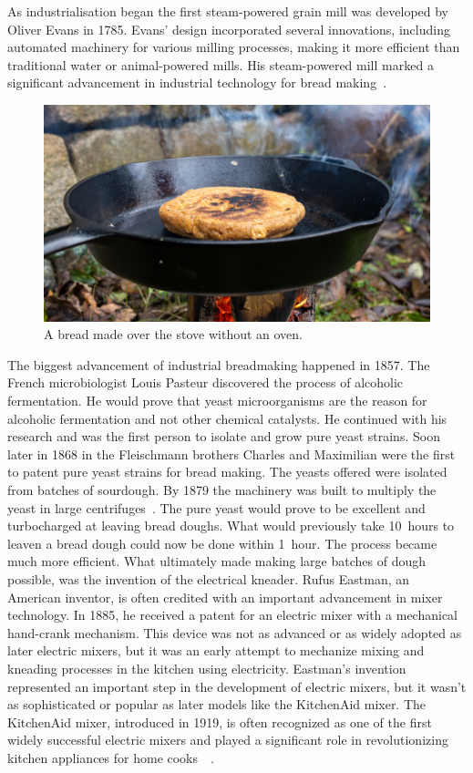 As industrialisation began the first steam-powered grain mill
was developed by Oliver Evans in \num{1785}. Evans' design incorporated
several innovations, including automated machinery for various
milling processes, making it more efficient than traditional water
or animal-powered mills. His steam-powered mill marked a significant advancement
in industrial technology for bread making~\cite{evans+mill}.

\begin{figure}[ht]
  \includegraphics[width=\textwidth]{sourdough-stove}
  \caption{A bread made over the stove without an oven.}%
  \label{sourdough-stove}
\end{figure}

The biggest advancement of industrial breadmaking happened in \num{1857}.
The French microbiologist Louis Pasteur discovered
the process of alcoholic fermentation. He would prove that
yeast microorganisms are the reason for alcoholic fermentation
and not other chemical catalysts. He continued with his research and
was the first person to isolate and grow pure yeast strains.
Soon later in \num{1868} in the Fleischmann brothers Charles
and Maximilian were the first to patent pure yeast strains
for bread making. The yeasts offered
were isolated from batches of sourdough. By \num{1879} the machinery was built
to multiply the yeast in large centrifuges~\cite{fleischmann+history}.
The pure yeast would prove to be excellent and turbocharged
at leaving bread doughs. What would previously take 10~hours
to leaven a bread dough could now be done within 1~hour.
The process became much more efficient. What ultimately made making large
batches of dough possible, was the invention of the electrical kneader.
Rufus Eastman, an American inventor, is often credited with an
important advancement in mixer technology. In \num{1885}, he received a patent
for an electric mixer with a mechanical hand-crank mechanism.
This device was not as advanced or as widely adopted as later
electric mixers, but it was an early attempt to mechanize mixing
and kneading processes in the kitchen using electricity.
Eastman's invention represented an important step in the development
of electric mixers, but it wasn't as sophisticated or popular as
later models like the KitchenAid mixer. The KitchenAid mixer,
introduced in \num{1919}, is often recognized as one of the first widely
successful electric mixers and played a significant role
in revolutionizing kitchen appliances for
home cooks~\cite{first+mixer}~\cite{kitchenaid+history}.

